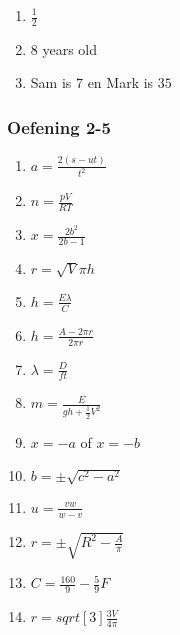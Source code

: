 {\begin{multicols}{3}
\begin{enumerate}[noitemsep, label=\textbf{\arabic*}. ]
\item $\frac{1}{2}$ %
\item $8$ years old %
\item Sam is $7$ en Mark is $35$ %
\end{enumerate}

\subsubsection*{Oefening 2-5} %

\begin{enumerate}[itemsep=1pt,  label=\textbf{\arabic*}. ] 
\item $a = \frac{2(s - ut)}{t^2}$%
\item $n = \frac{pV}{RT}$%
\item $x = \frac{2b^2}{2b - 1}$%
\item $r = \sqrt{V}{\pi h}$%
\item $h = \frac{E\lambda}{C}$%

\item $h = \frac{A - 2\pi r}{2\pi r}$%
\item $\lambda = \frac{D}{ft}$%
\item $m =\frac{E}{gh + \frac{1}{2}V^2}$%
\item $x=-a$ of $x=-b$ %
\item $b=\pm \sqrt{c^2-a^2}$ %
\item $u=\frac{vw}{w-v}$ %
\item $r=\pm \sqrt{R^2-\frac{A}{\pi}}$ 
\item $C=\frac{160}{9}-\frac{5}{9}F$ %
\item $r=sqrt[3]{\frac{3V}{4 \pi}}$ %
\end{enumerate}



\end{multicols}}
